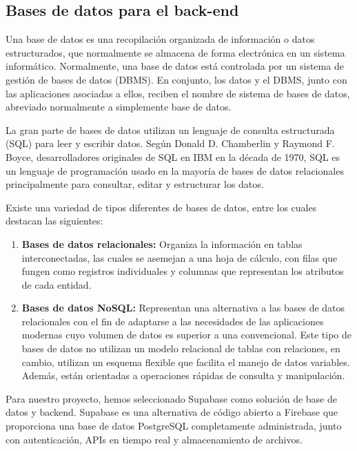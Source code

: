 \documentclass[12pt,a4paper]{report}
\begin{document}
\subsection{Bases de datos para el back-end}

Una base de datos es una recopilación organizada de información o datos estructurados, que normalmente se almacena de forma electrónica en un sistema informático. Normalmente, una base de datos está controlada por un sistema de gestión de bases de datos (DBMS). En conjunto, los datos y el DBMS, junto con las aplicaciones asociadas a ellos, reciben el nombre de sistema de bases de datos, abreviado normalmente a simplemente base de datos.

La gran parte de bases de datos utilizan un lenguaje de consulta estructurada (SQL) para leer y escribir datos. Según Donald D. Chamberlin y Raymond F. Boyce, desarrolladores originales de SQL en IBM en la década de 1970, SQL es un lenguaje de programación usado en la mayoría de bases de datos relacionales principalmente para consultar, editar y estructurar los datos.

Existe una variedad de tipos diferentes de bases de datos, entre los cuales destacan las siguientes:

\begin{enumerate}
\item \textbf{Bases de datos relacionales:} Organiza la información en tablas interconectadas, las cuales se asemejan a una hoja de cálculo, con filas que fungen como registros individuales y columnas que representan los atributos de cada entidad.

\item \textbf{Bases de datos NoSQL:} Representan una alternativa a las bases de datos relacionales con el fin de adaptarse a las necesidades de las aplicaciones modernas cuyo volumen de datos es superior a una convencional. Este tipo de bases de datos no utilizan un modelo relacional de tablas con relaciones, en cambio, utilizan un esquema flexible que facilita el manejo de datos variables. Además, están orientadas a operaciones rápidas de consulta y manipulación.
\end{enumerate}

Para nuestro proyecto, hemos seleccionado Supabase como solución de base de datos y backend. Supabase es una alternativa de código abierto a Firebase que proporciona una base de datos PostgreSQL completamente administrada, junto con autenticación, APIs en tiempo real y almacenamiento de archivos.
\end{document}
